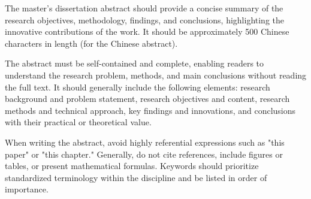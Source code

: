 \begin{enabstract}

The master's dissertation abstract should provide a concise summary of the research objectives, methodology, findings, and conclusions, highlighting the innovative contributions of the work. It should be approximately 500 Chinese characters in length (for the Chinese abstract).

The abstract must be self-contained and complete, enabling readers to understand the research problem, methods, and main conclusions without reading the full text. It should generally include the following elements: research background and problem statement, research objectives and content, research methods and technical approach, key findings and innovations, and conclusions with their practical or theoretical value.

When writing the abstract, avoid highly referential expressions such as "this paper" or "this chapter." Generally, do not cite references, include figures or tables, or present mathematical formulas. Keywords should prioritize standardized terminology within the discipline and be listed in order of importance.

\par\vspace{\baselineskip}
\end{enabstract}

\cleardoublepage %
